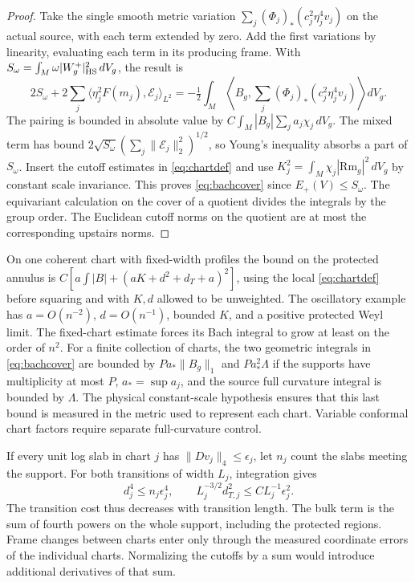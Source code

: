 \documentclass[11pt]{article}
\theoremstyle{remark}
\newcommand{\Rm}{\mathrm{Rm}}
\newcommand{\ip}[2]{\langle #1,#2\rangle}
\begin{document}
\begin{proof}
Take the single smooth metric variation \(\sum_j(\Phi_j)_*(c_j^2\eta_j^4v_j)\) on the actual source, with each term extended by zero. Add the first variations by linearity, evaluating each term in its producing frame. With \(S_\omega=\int_M\omega |W_g^+|_{\rm HS}^2\,dV_g\), the result is
\[
 2S_\omega+2\sum_j\ip{\eta_j^2F(m_j)}{\mathcal E_j}_{L^2}
 =-\tfrac12\int_M\left\langle B_g,
       \sum_j(\Phi_j)_*(c_j^2\eta_j^4v_j)\right\rangle dV_g .
\]
The pairing is bounded in absolute value by \(C\int_M |B_g|\sum_ja_j\chi_j\,dV_g\). The mixed term has bound \(2\sqrt{S_\omega}(\sum_j\|\mathcal E_j\|_2^2)^{1/2}\), so Young's inequality absorbs a part of \(S_\omega\). Insert the cutoff estimates in \eqref{eq:chartdef} and use \(K_j^2=\int_M\chi_j|\Rm_g|^2\,dV_g\) by constant scale invariance. This proves \eqref{eq:bachcover} since \(E_+(V)\le S_\omega\). The equivariant calculation on the cover of a quotient divides the integrals by the group order. The Euclidean cutoff norms on the quotient are at most the corresponding upstairs norms.
\end{proof}

On one coherent chart with fixed-width profiles the bound on the protected annulus is \(C[a\int |B|+(aK+d^2+d_T+a)^2]\), using the local \eqref{eq:chartdef} before squaring and with \(K,d\) allowed to be unweighted. The oscillatory example has \(a=O(n^{-2})\), \(d=O(n^{-1})\), bounded \(K\), and a positive protected Weyl limit. The fixed-chart estimate forces its Bach integral to grow at least on the order of \(n^2\). For a finite collection of charts, the two geometric integrals in \eqref{eq:bachcover} are bounded by \(P a_*\|B_g\|_1\) and \(P a_*^2\Lambda\) if the supports have multiplicity at most \(P\), \(a_*=\sup a_j\), and the source full curvature integral is bounded by \(\Lambda\). The physical constant-scale hypothesis ensures that this last bound is measured in the metric used to represent each chart. Variable conformal chart factors require separate full-curvature control.

If every unit log slab in chart \(j\) has \(\|Dv_j\|_4\le\epsilon_j\), let \(n_j\) count the slabs meeting the support. For both transitions of width \(L_j\), integration gives
\[
 d_j^4\le n_j\epsilon_j^4,\qquad
 L_j^{-3/2}d_{T,j}^2\le C L_j^{-1}\epsilon_j^2.
\]
The transition cost thus decreases with transition length. The bulk term is the sum of fourth powers on the whole support, including the protected regions. Frame changes between charts enter only through the measured coordinate errors of the individual charts. Normalizing the cutoffs by a sum would introduce additional derivatives of that sum.
\end{document}
